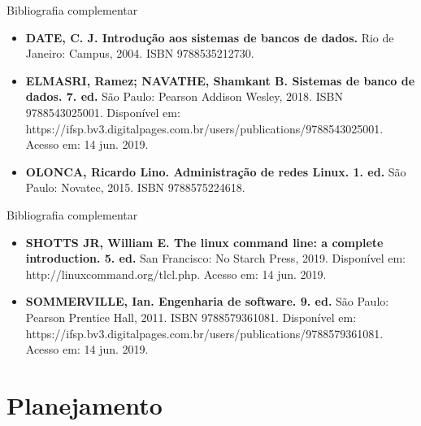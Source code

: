 \documentclass{beamer}
\begin{document}
\begin{frame}{Bibliografia complementar}
      \begin{itemize}
            \item \textbf{DATE, C. J. \textcolor{sintefdarkgreen}{Introdução aos sistemas de bancos de dados.}} Rio de Janeiro: Campus, 2004. ISBN 9788535212730.
            \item \textbf{ELMASRI, Ramez; NAVATHE, Shamkant B. \textcolor{sintefdarkgreen}{Sistemas de banco de dados. 7. ed.}} São Paulo: Pearson Addison Wesley, 2018. ISBN 9788543025001. Disponível em: https://ifsp.bv3.digitalpages.com.br/users/publications/9788543025001. Acesso em: 14 jun. 2019.
            \item \textbf{OLONCA, Ricardo Lino. \textcolor{sintefdarkgreen}{Administração de redes Linux. 1. ed.}} São Paulo: Novatec, 2015. ISBN 9788575224618. 
           
      \end{itemize}
\end{frame}

\begin{frame}{Bibliografia complementar}
      \begin{itemize}
            \item \textbf{SHOTTS JR, William E. \textcolor{sintefdarkgreen}{The linux command line: a complete introduction. 5. ed.}} San Francisco: No Starch Press, 2019. Disponível em: http://linuxcommand.org/tlcl.php. Acesso em: 14 jun. 2019.
            \item \textbf{SOMMERVILLE, Ian. \textcolor{sintefdarkgreen}{Engenharia de software. 9. ed.}} São Paulo: Pearson Prentice Hall, 2011. ISBN 9788579361081. Disponível em: https://ifsp.bv3.digitalpages.com.br/users/publications/9788579361081. Acesso em: 14 jun. 2019.
            
      \end{itemize}
\end{frame}

\section{Planejamento}
\end{document}
